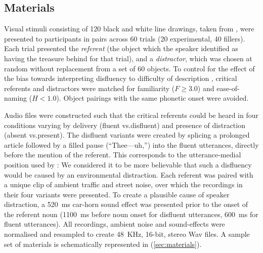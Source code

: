 \documentclass[a4paper,man,natbib]{apa6}
\newcommand*{\spex}[1]{``{#1}''} %
\begin{document}
\subsection{Materials}
Visual stimuli consisting of 120 black and white line drawings, taken from \citet{Snodgrass1980}, were presented to participants in pairs across 60 trials (20 experimental, 40 fillers). 
Each trial presented the \textit{referent} (the object which the speaker identified as having the treasure behind for that trial), and a \textit{distractor}, which was chosen at random without replacement from a set of 60 objects. 
To control for the effect of the bias towards interpreting disfluency to difficulty of description \citep{Arnold2007}, critical referents and distractors were matched for familiarity ($F \ge 3.0$) and ease-of-naming ($H <1.0$). 
Object pairings with the same phonetic onset were avoided. 

Audio files were constructed such that the critical referents could be heard in four conditions varying by delivery (fluent vs.\@ disfluent) and presence of distraction (absent vs.\@ present). 
The disfluent variants were created by splicing a prolonged article followed by a filled pause (\spex{Thee---uh,}) into the fluent utterances, directly before the mention of the referent.
This corresponds to the utterance-medial position used by \citet{Loy2016}:
We considered it to be more believable that such a disfluency would be caused by an environmental distraction.
Each referent was paired with a unique clip of ambient traffic and street noise, over which the recordings in their four variants were presented.
To create a plausible cause of speaker distraction, a 520~ms car-horn sound effect was presented prior to the onset of the referent noun (1100~ms before noun onset for disfluent utterances, 600~ms for fluent utterances). 
All recordings, ambient noise and sound-effects were normalised and resampled to create 48~KHz, 16-bit, stereo Wav files.
A sample set of materials is schematically represented in (\ref{sec:materials}).
\end{document}
